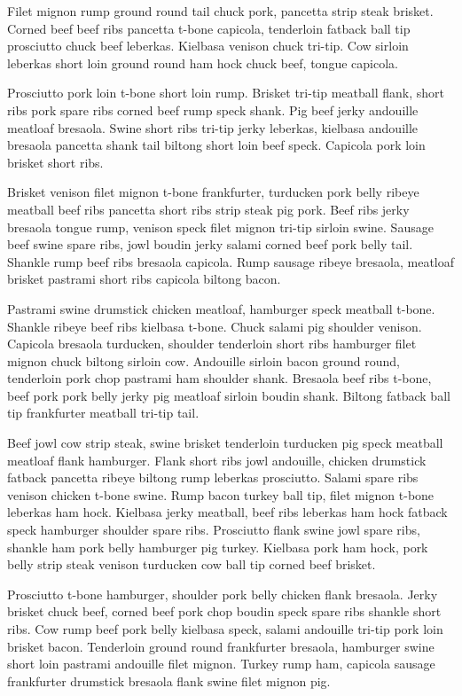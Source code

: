 Filet mignon rump ground round tail chuck pork, pancetta strip steak brisket. Corned beef beef ribs pancetta t-bone capicola, tenderloin fatback ball tip prosciutto chuck beef leberkas. Kielbasa venison chuck tri-tip. Cow sirloin leberkas short loin ground round ham hock chuck beef, tongue capicola.

Prosciutto pork loin t-bone short loin rump. Brisket tri-tip meatball flank, short ribs pork spare ribs corned beef rump speck shank. Pig beef jerky andouille meatloaf bresaola. Swine short ribs tri-tip jerky leberkas, kielbasa andouille bresaola pancetta shank tail biltong short loin beef speck. Capicola pork loin brisket short ribs.

Brisket venison filet mignon t-bone frankfurter, turducken pork belly ribeye meatball beef ribs pancetta short ribs strip steak pig pork. Beef ribs jerky bresaola tongue rump, venison speck filet mignon tri-tip sirloin swine. Sausage beef swine spare ribs, jowl boudin jerky salami corned beef pork belly tail. Shankle rump beef ribs bresaola capicola. Rump sausage ribeye bresaola, meatloaf brisket pastrami short ribs capicola biltong bacon.

Pastrami swine drumstick chicken meatloaf, hamburger speck meatball t-bone. Shankle ribeye beef ribs kielbasa t-bone. Chuck salami pig shoulder venison. Capicola bresaola turducken, shoulder tenderloin short ribs hamburger filet mignon chuck biltong sirloin cow. Andouille sirloin bacon ground round, tenderloin pork chop pastrami ham shoulder shank. Bresaola beef ribs t-bone, beef pork pork belly jerky pig meatloaf sirloin boudin shank. Biltong fatback ball tip frankfurter meatball tri-tip tail.

Beef jowl cow strip steak, swine brisket tenderloin turducken pig speck meatball meatloaf flank hamburger. Flank short ribs jowl andouille, chicken drumstick fatback pancetta ribeye biltong rump leberkas prosciutto. Salami spare ribs venison chicken t-bone swine. Rump bacon turkey ball tip, filet mignon t-bone leberkas ham hock. Kielbasa jerky meatball, beef ribs leberkas ham hock fatback speck hamburger shoulder spare ribs. Prosciutto flank swine jowl spare ribs, shankle ham pork belly hamburger pig turkey. Kielbasa pork ham hock, pork belly strip steak venison turducken cow ball tip corned beef brisket.

Prosciutto t-bone hamburger, shoulder pork belly chicken flank bresaola. Jerky brisket chuck beef, corned beef pork chop boudin speck spare ribs shankle short ribs. Cow rump beef pork belly kielbasa speck, salami andouille tri-tip pork loin brisket bacon. Tenderloin ground round frankfurter bresaola, hamburger swine short loin pastrami andouille filet mignon. Turkey rump ham, capicola sausage frankfurter drumstick bresaola flank swine filet mignon pig.

